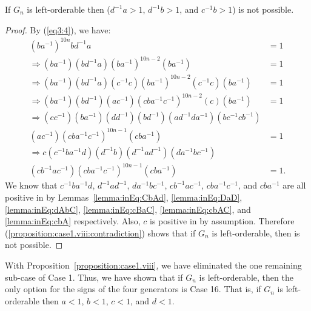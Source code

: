 \begin{proposition}
If $G_{n}$ is left-orderable then  ($d^{-1}a > 1$, $d^{-1}b>1$, and $c^{-1}b>1$) is not possible.
\label{proposition:case1.viii}
\end{proposition}
\begin{proof} By (\ref{eq3:4}), we have:
\begin{align}
(ba^{-1})^{10n}bd^{-1}a&=1\nonumber{}\\
\Rightarrow{}(ba^{-1})(bd^{-1}a)(ba^{-1})^{10n-2}(ba^{-1})&=1\nonumber{}\\
\Rightarrow{}(ba^{-1})(bd^{-1}a)(c^{-1}c)(ba^{-1})^{10n-2}(c^{-1}c)(ba^{-1})&=1\nonumber{}\\
\Rightarrow{}(ba^{-1})(bd^{-1})(ac^{-1})(cba^{-1}c^{-1})^{10n-2}(c)(ba^{-1})&=1\nonumber{}\\
\Rightarrow{}(cc^{-1})(ba^{-1})(dd^{-1})(bd^{-1})(ad^{-1}da^{-1})(bc^{-1}cb^{-1})\nonumber{}\\
(ac^{-1})(cba^{-1}c^{-1})^{10n-1}(cba^{-1})&=1\nonumber{}\\
\Rightarrow{}c(c^{-1}ba^{-1}d)(d^{-1}b)(d^{-1}ad^{-1})(da^{-1}bc^{-1})\nonumber{}\\
(cb^{-1}ac^{-1})(cba^{-1}c^{-1})^{10n-1}(cba^{-1})&=1.\label{proposition:case1.viii:contradiction}
\end{align}
We know that $c^{-1}ba^{-1}d$, $d^{-1}ad^{-1}$, $da^{-1}bc^{-1}$, $cb^{-1}ac^{-1}$, $cba^{-1}c^{-1}$, and  $cba^{-1}$ are all positive in  by Lemmas~\ref{lemma:inEq:CbAd}, \ref{lemma:inEq:DaD}, \ref{lemma:inEq:dAbC}, \ref{lemma:inEq:cBaC}, \ref{lemma:inEq:cbAC}, and \ref{lemma:inEq:cbA} respectively. Also, $c$ is positive in  by assumption. Therefore (\ref{proposition:case1.viii:contradiction}) shows that if $G_n$ is left-orderable, then  is not possible.
\end{proof}



\noindent{}With Proposition~\ref{proposition:case1.viii}, we have eliminated the one remaining sub-case of Case 1. Thus, we have shown that if $G_n$ is left-orderable, then the only option for the signs of the four generators is Case 16. That is, if $G_n$ is left-orderable then $a<1$, $b<1$, $c<1$, and $d<1$.